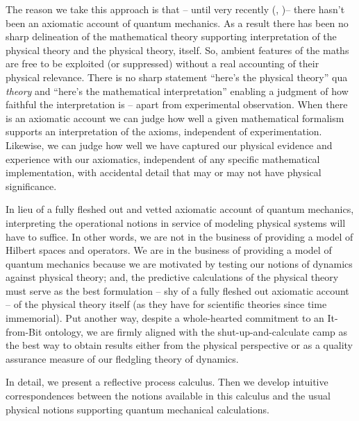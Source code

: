 The reason we take this approach is that -- until very recently
(\cite{DBLP:conf/lics/Abramsky04},
\cite{DBLP:conf/calco/Abramsky05})-- there hasn't been an axiomatic
account of quantum mechanics. As a result there has been no sharp
delineation of the mathematical theory supporting interpretation of
the physical theory and the physical theory, itself. So, ambient
features of the maths are free to be exploited (or suppressed) without
a real accounting of their physical relevance. There is no sharp
statement ``here's the physical theory'' qua \emph{theory} and
``here's the mathematical interpretation'' enabling a judgment of how
faithful the interpretation is -- apart from experimental
observation. When there is an axiomatic account we can judge how well
a given mathematical formalism supports an interpretation of the
axioms, independent of experimentation. Likewise, we can judge how
well we have captured our physical evidence and experience with our
axiomatics, independent of any specific mathematical implementation,
with accidental detail that may or may not have physical significance.

In lieu of a fully fleshed out and vetted axiomatic account of quantum
mechanics, interpreting the operational notions in service of modeling
physical systems will have to suffice. In other words, we are not in
the business of providing a model of Hilbert spaces and operators. We
are in the business of providing a model of quantum mechanics because
we are motivated by testing our notions of dynamics against physical
theory; and, the predictive calculations of the physical theory must
serve as the best formulation -- shy of a fully fleshed out axiomatic
account -- of the physical theory itself (as they have for scientific
theories since time immemorial). Put another way, despite a
whole-hearted commitment to an It-from-Bit ontology, we are firmly
aligned with the shut-up-and-calculate camp as the best way to obtain
results either from the physical perspective or as a quality assurance
measure of our fledgling theory of dynamics.

In detail, we present a reflective process calculus. Then we develop
intuitive correspondences between the notions available in this
calculus and the usual physical notions supporting quantum mechanical
calculations. 

\begin{table}[htp]
  \caption{QM - process calculi correspondences}
\end{table}

